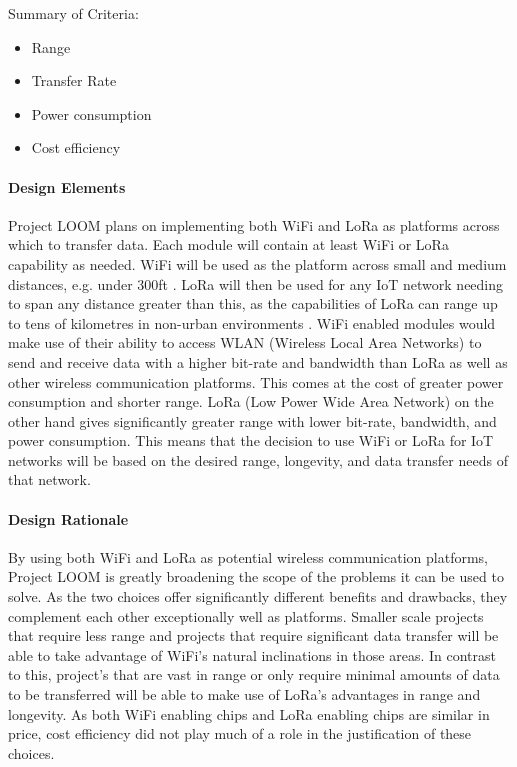 \documentclass[onecolumn, draftclsnofoot,10pt, compsoc]{IEEEtran}
\begin{document}
    Summary of Criteria:
    \begin{itemize}[noitemsep,topsep=-10pt]
        \item Range
        \item Transfer Rate
        \item Power consumption
        \item Cost efficiency
    \end{itemize}

\paragraph{Design Elements}
    Project LOOM plans on implementing both WiFi and LoRa as platforms across which to transfer data. Each module will contain at least WiFi or LoRa capability as needed. WiFi will be used as the platform across small and medium distances, e.g. under 300ft \cite{WiFi}. LoRa will then be used for any IoT network needing to span any distance greater than this, as the capabilities of LoRa can range up to tens of kilometres in non-urban environments \cite{LoRa}. WiFi enabled modules would make use of their ability to access WLAN (Wireless Local Area Networks) to send and receive data with a higher bit-rate and bandwidth than LoRa as well as other wireless communication platforms. This comes at the cost of greater power consumption and shorter range. LoRa (Low Power Wide Area Network) on the other hand gives significantly greater range with lower bit-rate, bandwidth, and power consumption. This means that the decision to use WiFi or LoRa for IoT networks will be based on the desired range, longevity, and data transfer needs of that network.

\paragraph{Design Rationale}
    By using both WiFi and LoRa as potential wireless communication platforms, Project LOOM is greatly broadening the scope of the problems it can be used to solve. As the two choices offer significantly different benefits and drawbacks, they complement each other exceptionally well as platforms. Smaller scale projects that require less range and projects that require significant data transfer will be able to take advantage of WiFi's natural inclinations in those areas. In contrast to this, project's that are vast in range or only require minimal amounts of data to be transferred will be able to make use of LoRa's advantages in range and longevity. As both WiFi enabling chips and LoRa enabling chips are similar in price, cost efficiency did not play much of a role in the justification of these choices. 
\end{document}
